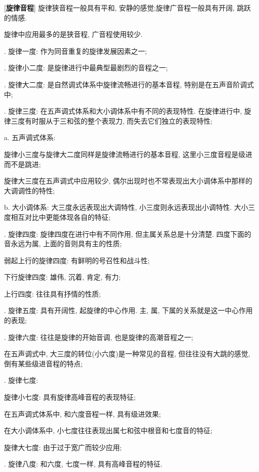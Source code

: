 \clearpage

[\textbf{旋律音程}] 旋律狭音程一般具有平和, 安静的感觉;旋律广音程一般具有开阔, 跳跃的情感.\par
\qquad 旋律中应用最多的是狭音程, 广音程使用较少.\par
{}. 旋律一度: 作为同音重复的旋律发展因素之一;\par
{}. 旋律小二度: 是旋律进行中最典型最剧烈的音程之一;\par
{}. 旋律大二度: 是自然调式体系中旋律流畅进行的基本音程, 特别是在五声音阶调式中;\par
{}. 旋律三度: 在五声调式体系和大小调体系中有不同的表现特性. 在旋律进行中, 旋律三度有时服从于三和弦的整个表现力, 而失去它们独立的表现特性;\par
\qquad \qquad a. 五声调式体系: \par
\qquad \qquad \qquad 旋律小三度与旋律大二度同样是旋律流畅进行的基本音程, 这里小三度音程是级进而不是跳进;\par
\qquad \qquad \qquad 旋律大三度在五声调式中应用较少, 偶尔出现时也不常表现出大小调体系中那样的大调调性的特性;\par
\qquad \qquad b. 大小调体系: 大三度永远表现出大调特性, 小三度则永远表现出小调特性. 大小三度相互对比中更能体现各自的特征;\par
{}. 旋律四度: 旋律四度在进行中有不同作用, 但主属关系总是十分清楚. 四度下面的音永远为属, 上面的音则具有主的性质;\par
\qquad \qquad 弱起上行的旋律四度: 有鲜明的号召性和战斗性;\par
\qquad \qquad 下行旋律四度: 雄伟, 沉着, 肯定, 有力;\par
\qquad \qquad 上行四度: 往往具有抒情的性质;\par
{}. 旋律五度: 具有开阔性, 起旋律的中心作用. 主, 属, 下属的关系就是这一中心作用的表现;\par
{}. 旋律六度: 往往是旋律的开始音调, 也是旋律的高潮音程之一;\par
\qquad \qquad 在五声调式中, 大三度的转位(小六度)是一种常见的音程, 但往往没有大跳的感觉, 倒有某些级进音程的特点;\par
{}. 旋律七度: \par
\qquad \qquad 旋律小七度: 具有旋律高峰音程的表现特征;\par
\qquad \qquad \qquad 在五声调式体系中, 和六度音程一样, 具有级进效果;\par
\qquad \qquad \qquad 在大小调体系中, 小七度往往表现出属七和弦中根音和七度音的特征;\par
\qquad \qquad 旋律大七度: 由于过于宽广而较少应用;\par
{}. 旋律八度: 和六度, 七度一样, 具有高峰音程的特征.\par

